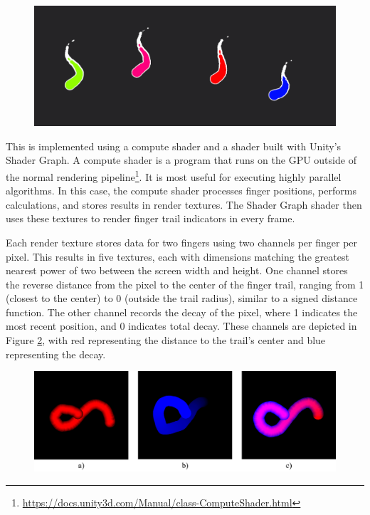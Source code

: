         \begin{figure}[h!]
            \centering
            \includegraphics[width=1\textwidth]{figures/touch_indicators.png}
            \label{fig:touch_indicators}
        \end{figure}

        This is implemented using a compute shader and a shader built with Unity's Shader Graph. A compute shader is a program that runs on the GPU outside of the normal rendering pipeline\footnote{\url{https://docs.unity3d.com/Manual/class-ComputeShader.html}}. It is most useful for executing highly parallel algorithms. In this case, the compute shader processes finger positions, performs calculations, and stores results in render textures. The Shader Graph shader then uses these textures to render finger trail indicators in every frame.

        Each render texture stores data for two fingers using two channels per finger per pixel. This results in five textures, each with dimensions matching the greatest nearest power of two between the screen width and height. One channel stores the reverse distance from the pixel to the center of the finger trail, ranging from 1 (closest to the center) to 0 (outside the trail radius), similar to a signed distance function. The other channel records the decay of the pixel, where 1 indicates the most recent position, and 0 indicates total decay. These channels are depicted in Figure \ref{fig:touch_progress}, with red representing the distance to the trail's center and blue representing the decay.
        
        \begin{figure}[h!]
            \centering
            \includegraphics[width=1\textwidth]{figures/touch_progress.png}
            \label{fig:touch_progress}
        \end{figure}

